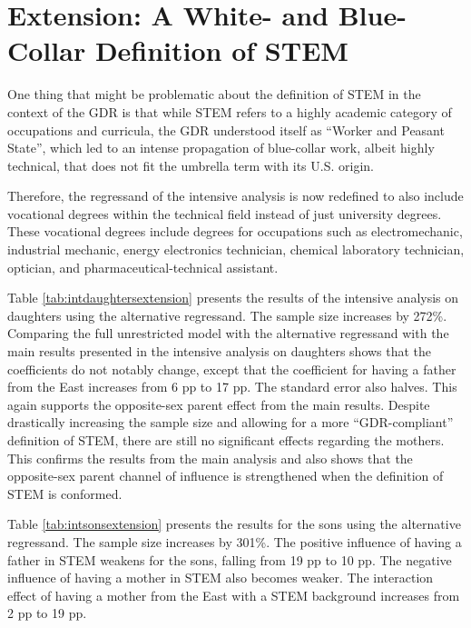 \documentclass[a4paper, oneside, hyperfootnotes = false]{article}
\begin{document}
{\section{Extension: A White- and Blue-Collar Definition of STEM}
\label{Extension}

One thing that might be problematic about the definition of STEM in the context of the GDR is that while STEM refers to a highly academic category of occupations and curricula, the GDR understood itself as ``Worker and Peasant State'', which led to an intense propagation of blue-collar work, albeit highly technical, that does not fit the umbrella term with its U.S. origin.

Therefore, the regressand of the intensive analysis is now redefined to also include vocational degrees within the technical field instead of just university degrees.
These vocational degrees include degrees for occupations such as electromechanic, industrial mechanic, energy electronics technician, chemical laboratory technician, optician, and pharmaceutical-technical assistant.

Table \ref{tab:intdaughtersextension} presents the results of the intensive analysis on daughters using the alternative regressand.
The sample size increases by 272\%.
Comparing the full unrestricted model with the alternative regressand with the main results presented in the intensive analysis on daughters shows that the coefficients do not notably change, except that the coefficient for having a father from the East increases from 6 pp to 17 pp.
The standard error also halves.
This again supports the opposite-sex parent effect from the main results.
Despite drastically increasing the sample size and allowing for a more ``GDR-compliant'' definition of STEM, there are still no significant effects regarding the mothers.
This confirms the results from the main analysis and also shows that the opposite-sex parent channel of influence is strengthened when the definition of STEM is conformed.

Table \ref{tab:intsonsextension} presents the results for the sons using the alternative regressand.
The sample size increases by 301\%.
The positive influence of having a father in STEM weakens for the sons, falling from 19 pp to 10 pp.
The negative influence of having a mother in STEM also becomes weaker.
The interaction effect of having a mother from the East with a STEM background increases from 2 pp to 19 pp.

}
\end{document}

